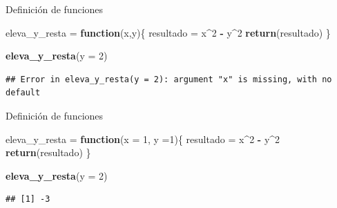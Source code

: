 \documentclass[ignorenonframetext,]{beamer}
\newenvironment{Shaded}{\begin{snugshade}}{\end{snugshade}}
\newcommand{\ControlFlowTok}[1]{\textcolor[rgb]{0.13,0.29,0.53}{\textbf{#1}}}
\newcommand{\DataTypeTok}[1]{\textcolor[rgb]{0.13,0.29,0.53}{#1}}
\newcommand{\DecValTok}[1]{\textcolor[rgb]{0.00,0.00,0.81}{#1}}
\newcommand{\KeywordTok}[1]{\textcolor[rgb]{0.13,0.29,0.53}{\textbf{#1}}}
\newcommand{\NormalTok}[1]{#1}
\newcommand{\OperatorTok}[1]{\textcolor[rgb]{0.81,0.36,0.00}{\textbf{#1}}}
\newcommand{\StringTok}[1]{\textcolor[rgb]{0.31,0.60,0.02}{#1}}
\begin{document}
\begin{frame}[fragile]{Definición de funciones}
\protect\hypertarget{definiciuxf3n-de-funciones-4}{}

\begin{Shaded}
\begin{Highlighting}[]
\NormalTok{eleva_y_resta =}\StringTok{ }\ControlFlowTok{function}\NormalTok{(x,y)\{}
\NormalTok{  resultado =}\StringTok{ }\NormalTok{x}\OperatorTok{^}\DecValTok{2} \OperatorTok{-}\StringTok{ }\NormalTok{y}\OperatorTok{^}\DecValTok{2}
  \KeywordTok{return}\NormalTok{(resultado)}
\NormalTok{\}}

\KeywordTok{eleva_y_resta}\NormalTok{(}\DataTypeTok{y =} \DecValTok{2}\NormalTok{)}
\end{Highlighting}
\end{Shaded}

\begin{verbatim}
## Error in eleva_y_resta(y = 2): argument "x" is missing, with no default
\end{verbatim}

\end{frame}

\begin{frame}[fragile]{Definición de funciones}
\protect\hypertarget{definiciuxf3n-de-funciones-5}{}

\begin{Shaded}
\begin{Highlighting}[]
\NormalTok{eleva_y_resta =}\StringTok{ }\ControlFlowTok{function}\NormalTok{(}\DataTypeTok{x =} \DecValTok{1}\NormalTok{, }\DataTypeTok{y =}\DecValTok{1}\NormalTok{)\{}
\NormalTok{  resultado =}\StringTok{ }\NormalTok{x}\OperatorTok{^}\DecValTok{2} \OperatorTok{-}\StringTok{ }\NormalTok{y}\OperatorTok{^}\DecValTok{2}
  \KeywordTok{return}\NormalTok{(resultado)}
\NormalTok{\}}

\KeywordTok{eleva_y_resta}\NormalTok{(}\DataTypeTok{y =} \DecValTok{2}\NormalTok{)}
\end{Highlighting}
\end{Shaded}

\begin{verbatim}
## [1] -3
\end{verbatim}

\end{frame}
\end{document}
